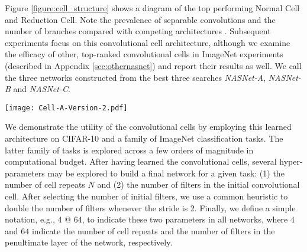 \documentclass[10pt,twocolumn,letterpaper]{article}
\begin{document}
Figure \ref{figure:cell_structure} shows a diagram of the top performing Normal Cell and Reduction Cell. Note the prevalence of separable convolutions and the number of branches compared with competing architectures \cite{simonyan2014very,szegedy2015going,he2015deep,szegedy2016rethinking,szegedy2016inception}. Subsequent experiments focus on this convolutional cell architecture, although we examine the efficacy of other, top-ranked  convolutional cells in ImageNet experiments (described in Appendix \ref{sec:othernasnet}) and report their results as well. We call the three networks constructed from the best three searches \emph{NASNet-A}, \emph{NASNet-B} and \emph{NASNet-C}.

\begin{figure*}[h!]
\begin{center}
\texttt{[image: Cell-A-Version-2.pdf]}
\caption{Architecture of the best convolutional cells (NASNet-A) with $B=5$ blocks identified with CIFAR-10 . The input (white) is the hidden state from previous activations (or input image). The output (pink) is the result of a concatenation operation across all resulting branches.
Each convolutional cell is the result of $B$ blocks.
A single block is corresponds to two primitive operations (yellow) and a combination operation (green). Note that colors correspond to operations in Figure \ref{figure:cell}. 
}
\label{figure:cell_structure}
\end{center}
\end{figure*}

We demonstrate the utility of the convolutional cells by employing this learned architecture on CIFAR-10 and a family of ImageNet classification tasks. The latter family of tasks is explored across a few orders of magnitude in computational budget.
After having learned the convolutional cells, several hyper-parameters may be explored to build a final network for a given task: (1) the number of cell repeats $N$ and (2) the number of filters in the initial convolutional cell. After selecting the number of initial filters, we use a common heuristic to double the number of filters whenever the stride is 2.
Finally, we define a simple notation, e.g.,  $4$ @ $64$, to indicate these two parameters in all networks, where $4$ and $64$ indicate the number of cell repeats and the number of filters in the penultimate layer of the network, respectively.
\end{document}
